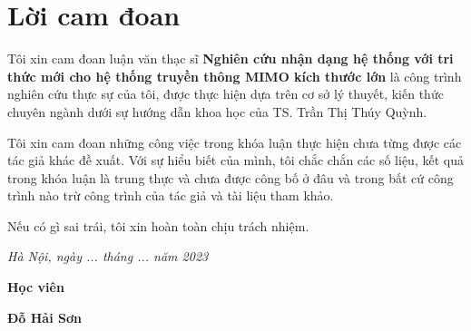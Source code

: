 \clearpage
{}

\chapter*{Lời cam đoan}

Tôi xin cam đoan luận văn thạc sĩ \textbf{Nghiên cứu nhận dạng hệ thống với tri thức mới cho hệ thống truyền thông MIMO kích thước lớn} là công trình nghiên cứu thực sự của tôi, được thực hiện dựa trên cơ sở lý thuyết, kiến thức chuyên ngành dưới sự hướng dẫn khoa học của TS. Trần Thị Thúy Quỳnh.

Tôi xin cam đoan những công việc trong khóa luận thực hiện chưa từng được các tác giả khác đề xuất. Với sự hiểu biết của mình, tôi chắc chắn các số liệu, kết quả trong khóa luận là trung thực và chưa được công bố ở đâu và trong bất cứ công trình nào trừ công trình của tác giả và tài liệu tham khảo.

Nếu có gì sai trái, tôi xin hoàn toàn chịu trách nhiệm.

\vspace{1cm}
\hspace{7cm}\textit{Hà Nội, ngày ... tháng ... năm 2023}

\hspace{9.4cm}\textbf{Học viên}
\vspace{2.5cm}


\hspace{9.3cm}\textbf{Đỗ Hải Sơn}